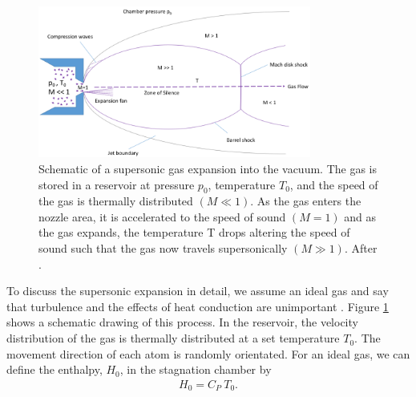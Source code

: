 \begin{figure}
	\centering
		\includegraphics[width=0.80\textwidth]{images/freeJetExpansion.png}
	\caption[Schematic of a supersonic gas expansion into a vacuum.]{Schematic of a supersonic gas expansion into the vacuum. The gas is stored in a reservoir at pressure $p_{0}$, temperature $T_{0}$, and the speed of the gas is thermally distributed $\left(M\ll 1\right)$. As the gas enters the nozzle area, it is accelerated to the speed of sound $\left(M=1\right)$ and as the gas expands, the temperature T drops altering the speed of sound such that the gas now travels supersonically $\left(M\gg 1\right)$. After \citep{Miller-1988-Oxford}.}
	\label{fig:freeJetExpansion}
\end{figure}
%
To discuss the supersonic expansion in detail, we assume an ideal gas and say that turbulence and the effects of heat conduction are unimportant \citep{Yamada-2001-SciDir,Haberland-1994-Springer}. Figure \ref{fig:freeJetExpansion} shows a schematic drawing of this process. In the reservoir, the velocity distribution of the gas is thermally distributed at a set temperature $T_{0}$. The movement direction of each atom is randomly orientated. For an ideal gas, we can define the enthalpy, $H_{0}$, in the stagnation chamber by
\begin{align}
H_{0}=C_{P}\ T_{0}.
\label{eq:stagnation-enthalpy}
\end{align}
